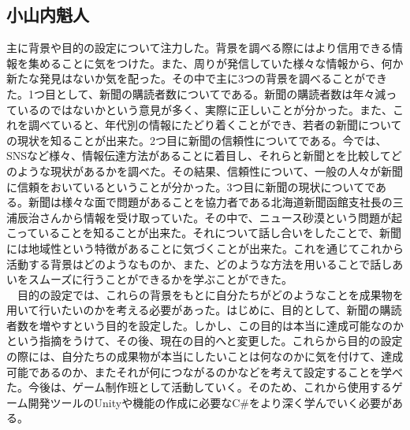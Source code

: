 \subsection{小山内魁人}
主に背景や目的の設定について注力した。背景を調べる際にはより信用できる情報を集めることに気をつけた。また、周りが発信していた様々な情報から、何か新たな発見はないか気を配った。その中で主に3つの背景を調べることができた。1つ目として、新聞の購読者数についてである。新聞の購読者数は年々減っているのではないかという意見が多く、実際に正しいことが分かった。また、これを調べていると、年代別の情報にたどり着くことができ、若者の新聞についての現状を知ることが出来た。2つ目に新聞の信頼性についてである。今では、SNSなど様々、情報伝達方法があることに着目し、それらと新聞とを比較してどのような現状があるかを調べた。その結果、信頼性について、一般の人々が新聞に信頼をおいているということが分かった。3つ目に新聞の現状についてである。新聞は様々な面で問題があることを協力者である北海道新聞函館支社長の三浦辰治さんから情報を受け取っていた。その中で、ニュース砂漠という問題が起こっていることを知ることが出来た。それについて話し合いをしたことで、新聞には地域性という特徴があることに気づくことが出来た。これを通じてこれから活動する背景はどのようなものか、また、どのような方法を用いることで話しあいをスムーズに行うことができるかを学ぶことができた。\\
　目的の設定では、これらの背景をもとに自分たちがどのようなことを成果物を用いて行いたいのかを考える必要があった。はじめに、目的として、新聞の購読者数を増やすという目的を設定した。しかし、この目的は本当に達成可能なのかという指摘をうけて、その後、現在の目的へと変更した。これらから目的の設定の際には、自分たちの成果物が本当にしたいことは何なのかに気を付けて、達成可能であるのか、またそれが何につながるのかなどを考えて設定することを学べた。今後は、ゲーム制作班として活動していく。そのため、これから使用するゲーム開発ツールのUnityや機能の作成に必要なC\#をより深く学んでいく必要がある。

